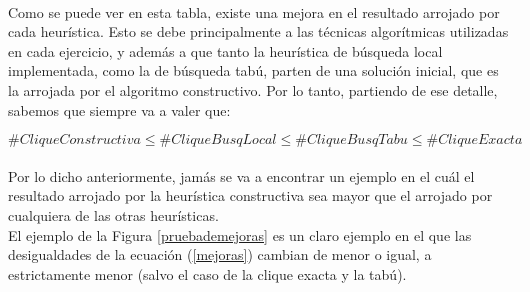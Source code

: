 \vspace*{1cm}

\paragraph{}
Como se puede ver en esta tabla, existe una mejora en el resultado arrojado por cada heurística. Esto se debe principalmente a las técnicas algorítmicas utilizadas en cada ejercicio, y además a que tanto la heurística de búsqueda local implementada, como la de búsqueda tabú, parten de una solución inicial, que es la arrojada por el algoritmo constructivo. Por lo tanto, partiendo de ese detalle, sabemos que siempre va a valer que:

\begin{equation}
 \#CliqueConstructiva \le \#CliqueBusqLocal \le \#CliqueBusqTabu \le \#CliqueExacta
\label{mejoras}
\end{equation}

\paragraph{}
Por lo dicho anteriormente, jamás se va a encontrar un ejemplo en el cuál el resultado arrojado por la heurística constructiva sea mayor que el arrojado por cualquiera de las otras heurísticas.\\
El ejemplo de la Figura \ref{pruebademejoras} es un claro ejemplo en el que las desigualdades de la ecuación (\ref{mejoras}) cambian de menor o igual, a estrictamente menor (salvo el caso de la clique exacta y la tabú).

